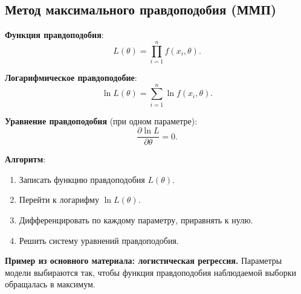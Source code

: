 \subsection*{Метод максимального правдоподобия (ММП)}

\textbf{Функция правдоподобия}:
\[
  L(\theta) = \prod_{i=1}^n f(x_i, \theta).
\]

\textbf{Логарифмическое правдоподобие}:
\[
  \ln L(\theta) = \sum_{i=1}^n \ln f(x_i, \theta).
\]

\textbf{Уравнение правдоподобия} (при одном параметре):
\[
  \frac{\partial \ln L}{\partial \theta} = 0.
\]

\textbf{Алгоритм}:
\begin{enumerate}
  \item Записать функцию правдоподобия $L(\theta)$.
  \item Перейти к логарифму $\ln L(\theta)$.
  \item Дифференцировать по каждому параметру, приравнять к нулю.
  \item Решить систему уравнений правдоподобия.
\end{enumerate}

\textbf{Пример из основного материала: логистическая регрессия.}
Параметры модели выбираются так, чтобы функция правдоподобия наблюдаемой выборки обращалась в максимум.

\clearpage
